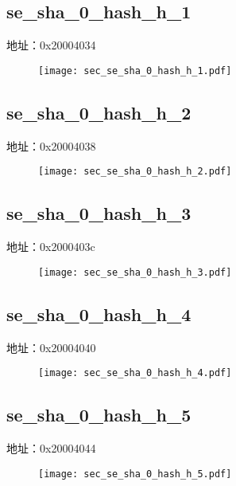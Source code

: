 \subsection{se\_sha\_0\_hash\_h\_1}
\label{sec-se-sha-0-hash-h-1}
地址：0x20004034
 \begin{figure}[H]
\texttt{[image: sec\_se\_sha\_0\_hash\_h\_1.pdf]}
\end{figure}

\subsection{se\_sha\_0\_hash\_h\_2}
\label{sec-se-sha-0-hash-h-2}
地址：0x20004038
 \begin{figure}[H]
\texttt{[image: sec\_se\_sha\_0\_hash\_h\_2.pdf]}
\end{figure}

\subsection{se\_sha\_0\_hash\_h\_3}
\label{sec-se-sha-0-hash-h-3}
地址：0x2000403c
 \begin{figure}[H]
\texttt{[image: sec\_se\_sha\_0\_hash\_h\_3.pdf]}
\end{figure}

\subsection{se\_sha\_0\_hash\_h\_4}
\label{sec-se-sha-0-hash-h-4}
地址：0x20004040
 \begin{figure}[H]
\texttt{[image: sec\_se\_sha\_0\_hash\_h\_4.pdf]}
\end{figure}

\subsection{se\_sha\_0\_hash\_h\_5}
\label{sec-se-sha-0-hash-h-5}
地址：0x20004044
 \begin{figure}[H]
\texttt{[image: sec\_se\_sha\_0\_hash\_h\_5.pdf]}
\end{figure}

